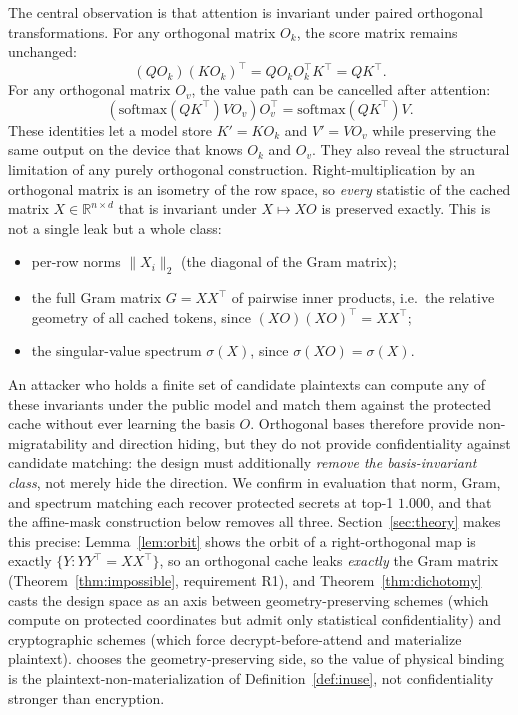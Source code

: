 The central observation is that attention is invariant under paired orthogonal transformations. For any orthogonal matrix $O_k$, the score matrix remains unchanged:
\begin{equation}
    (QO_k)(KO_k)^\top = QO_kO_k^\top K^\top = QK^\top.
\end{equation}
For any orthogonal matrix $O_v$, the value path can be cancelled after attention:
\begin{equation}
    \left(\mathrm{softmax}(QK^\top)V O_v\right)O_v^\top = \mathrm{softmax}(QK^\top)V.
\end{equation}
These identities let a model store $K'=KO_k$ and $V'=VO_v$ while preserving the same output on the device that knows $O_k$ and $O_v$. They also reveal the structural limitation of any purely orthogonal construction. Right-multiplication by an orthogonal matrix is an isometry of the row space, so \emph{every} statistic of the cached matrix $X\in\mathbb{R}^{n\times d}$ that is invariant under $X\mapsto XO$ is preserved exactly. This is not a single leak but a whole class:
\begin{itemize}
    \item per-row norms $\|X_i\|_2$ (the diagonal of the Gram matrix);
    \item the full Gram matrix $G=XX^\top$ of pairwise inner products, i.e.\ the relative geometry of all cached tokens, since $(XO)(XO)^\top = XX^\top$;
    \item the singular-value spectrum $\sigma(X)$, since $\sigma(XO)=\sigma(X)$.
\end{itemize}
An attacker who holds a finite set of candidate plaintexts can compute any of these invariants under the public model and match them against the protected cache without ever learning the basis $O$. Orthogonal bases therefore provide non-migratability and direction hiding, but they do not provide confidentiality against candidate matching: the design must additionally \emph{remove the basis-invariant class}, not merely hide the direction. We confirm in evaluation that norm, Gram, and spectrum matching each recover protected secrets at top-1 $1.000$, and that the affine-mask construction below removes all three. Section~\ref{sec:theory} makes this precise: Lemma~\ref{lem:orbit} shows the orbit of a right-orthogonal map is exactly $\{Y:YY^\top=XX^\top\}$, so an orthogonal cache leaks \emph{exactly} the Gram matrix (Theorem~\ref{thm:impossible}, requirement R1), and Theorem~\ref{thm:dichotomy} casts the design space as an axis between geometry-preserving schemes (which compute on protected coordinates but admit only statistical confidentiality) and cryptographic schemes (which force decrypt-before-attend and materialize plaintext). \sys{} chooses the geometry-preserving side, so the value of physical binding is the plaintext-non-materialization of Definition~\ref{def:inuse}, not confidentiality stronger than encryption.

